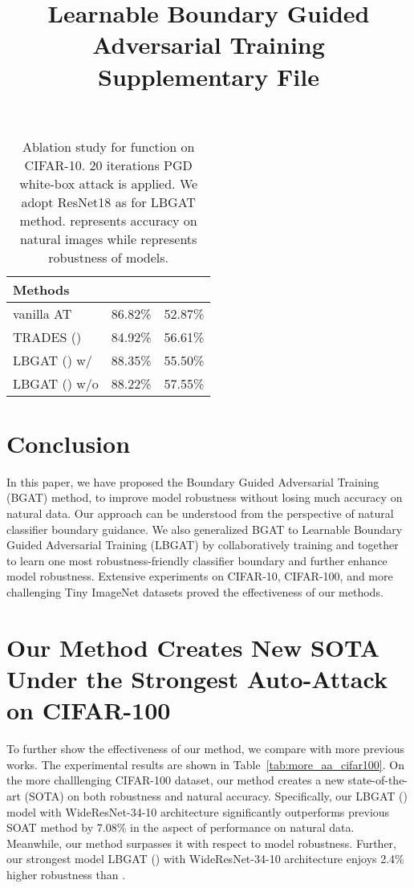 \documentclass[final]{cvpr}
\begin{document}
\begin{table}
	\centering
	\caption{Ablation study for  function on CIFAR-10. 20 iterations PGD white-box attack is applied. We adopt ResNet18 as  for LBGAT method.  represents accuracy on natural images while  represents robustness of models.} 
	\vspace{0.1cm}
	\begin{tabular}{l|c|c}
		\textbf{Methods} & & \\
		\hline
		\hline
		vanilla AT          &86.82\% &52.87\% \\
		TRADES () &84.92\% &56.61\% \\
	    LBGAT () w/          &88.35\% &55.50\% \\
	    LBGAT () w/o         &88.22\% &57.55\% \\
		\hline
		\hline
	\end{tabular}
	\label{tab:ablation_study}
\end{table}

\section{Conclusion}
In this paper, we have proposed the Boundary Guided Adversarial Training (BGAT) method, to improve model robustness without losing much accuracy on natural data. Our approach can be understood from the perspective of natural classifier boundary guidance. We also generalized BGAT to Learnable Boundary Guided Adversarial Training (LBGAT) by collaboratively training  and  together to learn one most robustness-friendly classifier boundary and further enhance model robustness. Extensive experiments on CIFAR-10, CIFAR-100, and more challenging Tiny ImageNet datasets proved the effectiveness of our methods.

{\small


}

\newpage
\onecolumn
\appendix

\title{\centering \Large \textbf{Learnable Boundary Guided Adversarial Training Supplementary File}}
\maketitle


\vspace{1.0in}	
\section{Our Method Creates New SOTA Under the Strongest Auto-Attack on CIFAR-100}
To further show the effectiveness of our method, we compare with more previous works. The experimental results are shown in Table~\ref{tab:more_aa_cifar100}. On the more challlenging CIFAR-100 dataset, our method creates a new state-of-the-art (SOTA) on both robustness and natural accuracy. Specifically, our LBGAT () model with WideResNet-34-10 architecture significantly outperforms previous SOAT method \cite{chen2020efficient} by 7.08\% in the aspect of performance on natural data. Meanwhile, our method surpasses it with respect to model robustness. Further, our strongest model LBGAT () with WideResNet-34-10 architecture enjoys 2.4\% higher robustness than \cite{chen2020efficient}.  
\end{document}
